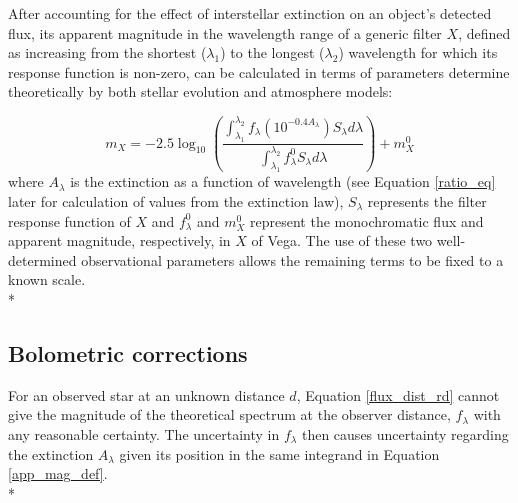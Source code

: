 \documentclass[12pt, a4paper]{report}
\begin{document}
After accounting for the effect of interstellar extinction on an object's detected flux, its apparent magnitude in the wavelength range of a generic filter $X$, defined as increasing from the shortest ($\lambda_{1}$) to the longest ($\lambda_{2}$) wavelength for which its response function is non-zero, can be calculated in terms of parameters determine theoretically by both stellar evolution and atmosphere models:

\begin{equation}
m_{X} = -2.5 \log_{10} \left(\frac{ \int_{\lambda_{1}}^{\lambda_{2}} f_{\lambda} \left( 10^{-0.4 A_{\lambda}} \right) S_{\lambda} d\lambda }{ \int_{\lambda_{1}}^{\lambda_{2}} f_{\lambda}^{0} S_{\lambda} d\lambda }\right) + m_{X}^{0}
\label{app_mag_def}
\end{equation}
where $A_{\lambda}$ is the extinction as a function of wavelength (see Equation \ref{ratio_eq} later for calculation of values from the \cite{1989ApJ...345..245C} extinction law), $S_{\lambda}$ represents the filter response function of $X$ and $f_{\lambda}^{0}$ and $m_{X}^{0}$ represent the monochromatic flux and apparent magnitude, respectively, in $X$ of Vega. The use of these two well-determined observational parameters allows the remaining terms to be fixed to a known scale.\\*

\subsection{Bolometric corrections}

For an observed star at an unknown distance $d$, Equation \ref{flux_dist_rd} cannot give the magnitude of the theoretical spectrum at the observer distance, $f_{\lambda}$ with any reasonable certainty. The uncertainty in $f_{\lambda}$ then causes uncertainty regarding the extinction $A_{\lambda}$ given its position in the same integrand in Equation \ref{app_mag_def}.\\*


\end{document}
